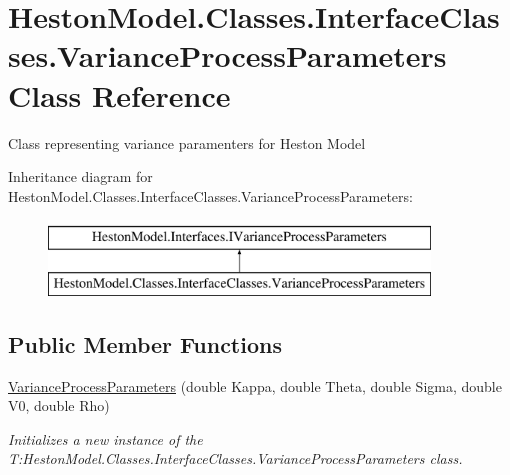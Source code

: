 \hypertarget{class_heston_model_1_1_classes_1_1_interface_classes_1_1_variance_process_parameters}{}\section{Heston\+Model.\+Classes.\+Interface\+Classes.\+Variance\+Process\+Parameters Class Reference}
\label{class_heston_model_1_1_classes_1_1_interface_classes_1_1_variance_process_parameters}


Class representing variance paramenters for Heston Model  


Inheritance diagram for Heston\+Model.\+Classes.\+Interface\+Classes.\+Variance\+Process\+Parameters\+:\begin{figure}[H]
\begin{center}
\leavevmode
\includegraphics[height=2.000000cm]{class_heston_model_1_1_classes_1_1_interface_classes_1_1_variance_process_parameters}
\end{center}
\end{figure}
\subsection*{Public Member Functions}
\begin{DoxyCompactItemize}
\item 
\mbox{\hyperlink{class_heston_model_1_1_classes_1_1_interface_classes_1_1_variance_process_parameters_a1877224d5a71168083d01e4edd3c48e9}{Variance\+Process\+Parameters}} (double Kappa, double Theta, double Sigma, double V0, double Rho)
\begin{DoxyCompactList}\small\item\em Initializes a new instance of the T\+:\+Heston\+Model.\+Classes.\+Interface\+Classes.\+Variance\+Process\+Parameters class. \end{DoxyCompactList}\end{DoxyCompactItemize}
